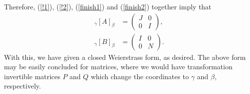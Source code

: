Therefore, (\ref{!1}),  (\ref{!2}),  (\ref{finish1}) and  (\ref{finish2}) together imply that
\begin{equation*}
\begin{aligned}
{}_{\gamma}[A]_{\beta}
&=
\begin{pmatrix}
J & 0\\
0 & I
\end{pmatrix},
\\[1em]
{}_{\gamma}[B]_{\beta}
&=
\begin{pmatrix}
I & 0\\
0 & N
\end{pmatrix}.
\end{aligned}
\end{equation*}
With this, we have given a closed Weierstrass form, as desired. The above form may be easily concluded for matrices, where we would have transformation invertible matrices $P$ and $Q$ which change the coordinates to $\gamma$ and $\beta$, respectively.









